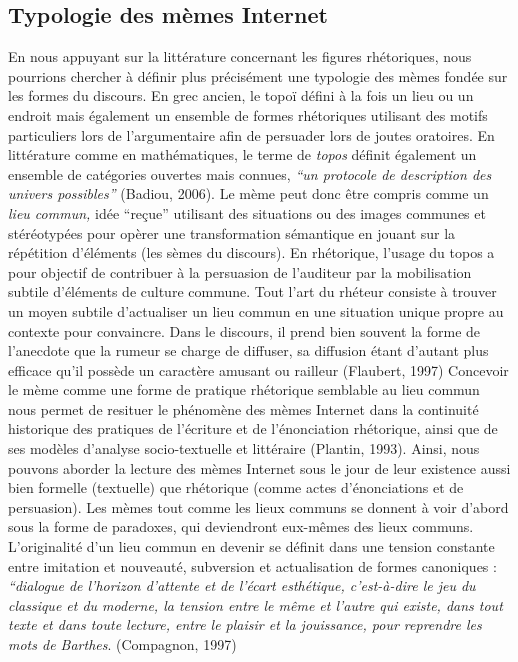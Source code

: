 {{\subsection[Typologie des m\`emes Internet]{Typologie des m\`emes Internet}
En nous appuyant sur la litt\'erature concernant les figures
rh\'etoriques, nous pourrions chercher \`a d\'efinir plus
pr\'ecis\'ement une typologie des m\`emes fond\'ee sur les formes du
discours. En grec ancien, le topo\"i d\'efini \`a la fois un lieu ou un
endroit mais \'egalement un ensemble de formes rh\'etoriques utilisant
des motifs particuliers lors de l{\textquoteright}argumentaire afin de
persuader lors de joutes oratoires. En litt\'erature comme en
math\'ematiques, le terme de \textit{topos }d\'efinit \'egalement un
ensemble de cat\'egories ouvertes mais connues,
\textit{{\textquotedblleft}un protocole de description des univers
possibles{\textquotedblright} }(Badiou, 2006). Le m\`eme peut donc
\^etre compris comme un \textit{lieu commun, }id\'ee
{\textquotedblleft}re\c{c}ue{\textquotedblright} utilisant des
situations ou des images communes et st\'er\'eotyp\'ees pour op\`erer
une transformation s\'emantique en jouant sur la r\'ep\'etition
d'\'el\'ements (les s\`emes du discours). En
rh\'etorique, l{\textquoteright}usage du topos a pour objectif de
contribuer \`a la persuasion de l{\textquoteright}auditeur par la
mobilisation subtile d{\textquoteright}\'el\'ements de culture commune.
Tout l{\textquoteright}art du rh\'eteur consiste \`a trouver un moyen
subtile d{\textquoteright}actualiser un lieu commun en une situation
unique propre au contexte pour convaincre. Dans le discours, il prend
bien souvent la forme de l{\textquoteright}anecdote que la rumeur se
charge de diffuser, sa diffusion \'etant d{\textquoteright}autant plus
efficace qu{\textquoteright}il poss\`ede un caract\`ere amusant ou
railleur (Flaubert, 1997) Concevoir le m\`eme comme une forme de
pratique rh\'etorique semblable au lieu commun nous permet de resituer
le ph\'enom\`ene des m\`emes Internet dans la continuit\'e historique
des pratiques de l{\textquoteright}\'ecriture et de
l{\textquoteright}\'enonciation rh\'etorique, ainsi que de ses
mod\`eles d{\textquoteright}analyse socio-textuelle et litt\'eraire
(Plantin, 1993). Ainsi, nous pouvons aborder la lecture des m\`emes
Internet sous le jour de leur existence aussi bien formelle (textuelle)
que rh\'etorique (comme actes d{\textquoteright}\'enonciations et de
persuasion). Les m\`emes tout comme les lieux communs se donnent \`a
voir d{\textquoteright}abord sous la forme de paradoxes, qui
deviendront eux-m\^emes des lieux communs.
L{\textquoteright}originalit\'e d{\textquoteright}un lieu commun en
devenir se d\'efinit dans une tension constante entre imitation et
nouveaut\'e, subversion et actualisation de formes canoniques :
\textit{{\textquotedblleft}dialogue de l'horizon
d'attente et de l'\'ecart esth\'etique, c'est-\`a-dire le jeu du classique et du moderne, la tension entre le m\^eme et l'autre qui existe, dans tout texte et dans toute lecture, entre le plaisir et la jouissance, pour reprendre les mots de Barthes}. (Compagnon, 1997)

}}
